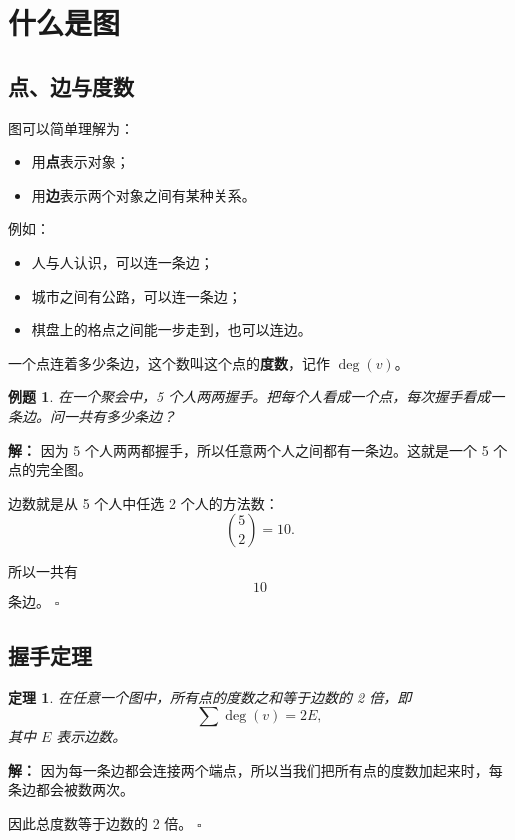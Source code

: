 \documentclass[11pt,a4paper,fontset=fandol]{ctexart}
\theoremstyle{formaltheorem}
\newtheorem{theorem}{定理}[section]
\theoremstyle{formalexample}
\newtheorem{example}{例题}[section]
\newenvironment{solution}{\par\noindent\textbf{解：}}{\hfill$\square$\par}
\begin{document}
\section{什么是图}

\subsection{点、边与度数}

图可以简单理解为：
\begin{itemize}
  \item 用\textbf{点}表示对象；
  \item 用\textbf{边}表示两个对象之间有某种关系。
\end{itemize}

例如：
\begin{itemize}
  \item 人与人认识，可以连一条边；
  \item 城市之间有公路，可以连一条边；
  \item 棋盘上的格点之间能一步走到，也可以连边。
\end{itemize}

一个点连着多少条边，这个数叫这个点的\textbf{度数}，记作 $\deg(v)$。

\begin{example}
在一个聚会中，5 个人两两握手。把每个人看成一个点，每次握手看成一条边。问一共有多少条边？
\end{example}

\begin{solution}
因为 5 个人两两都握手，所以任意两个人之间都有一条边。这就是一个 5 个点的完全图。

边数就是从 5 个人中任选 2 个人的方法数：
\[
\binom52=10.
\]

所以一共有
\[
10
\]
条边。
\end{solution}

\subsection{握手定理}

\begin{theorem}
在任意一个图中，所有点的度数之和等于边数的 2 倍，即
\[
\sum \deg(v)=2E,
\]
其中 $E$ 表示边数。
\end{theorem}

\begin{solution}
因为每一条边都会连接两个端点，所以当我们把所有点的度数加起来时，每条边都会被数两次。

因此总度数等于边数的 2 倍。
\end{solution}
\end{document}
